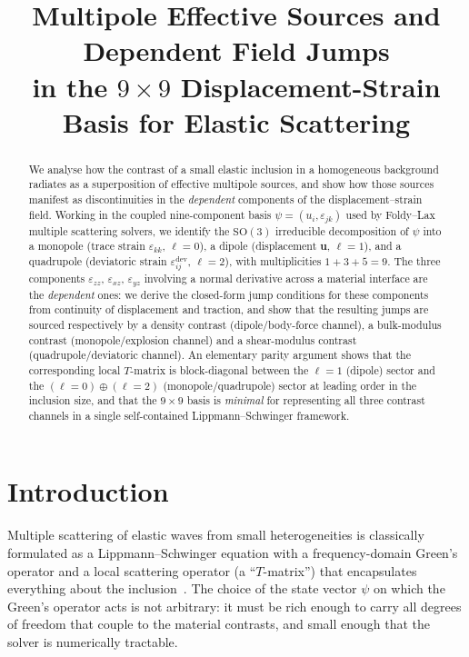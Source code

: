 \documentclass[11pt,a4paper]{article}
\title{%
  Multipole Effective Sources and Dependent Field Jumps\\
  in the $9{\times}9$ Displacement-Strain Basis for Elastic Scattering%
}
\author{}
\date{}
\newcommand{\eps}{\varepsilon}
\newcommand{\dev}{\mathrm{dev}}
\theoremstyle{plain}
\theoremstyle{definition}
\theoremstyle{remark}
\begin{document}
\maketitle
\thispagestyle{fancy}

\begin{abstract}
We analyse how the contrast of a small elastic inclusion in a homogeneous
background radiates as a superposition of effective multipole sources, and
show how those sources manifest as discontinuities in the \emph{dependent}
components of the displacement--strain field.  Working in the coupled
nine-component basis $\psi = (u_i,\eps_{jk})$ used by Foldy--Lax multiple
scattering solvers, we identify the $\mathrm{SO}(3)$ irreducible
decomposition of $\psi$ into a monopole (trace strain $\eps_{kk}$,
$\ell=0$), a dipole (displacement $\bm{u}$, $\ell=1$), and a quadrupole
(deviatoric strain $\eps_{ij}^{\dev}$, $\ell=2$), with multiplicities
$1+3+5=9$.  The three components $\eps_{zz}$, $\eps_{xz}$, $\eps_{yz}$
involving a normal derivative across a material interface are the
\emph{dependent} ones: we derive the closed-form jump conditions for these
components from continuity of displacement and traction, and show that the
resulting jumps are sourced respectively by a density contrast
(dipole/body-force channel), a bulk-modulus contrast (monopole/explosion
channel) and a shear-modulus contrast (quadrupole/deviatoric channel).
An elementary parity argument shows that the corresponding local
$T$-matrix is block-diagonal between the $\ell=1$ (dipole) sector and the
$(\ell=0)\oplus(\ell=2)$ (monopole/quadrupole) sector at leading order in
the inclusion size, and that the $9\times 9$ basis is
\emph{minimal} for representing all three contrast channels in a single
self-contained Lippmann--Schwinger framework.
\end{abstract}

\tableofcontents
\vspace{0.5em}

\section{Introduction}\label{sec:intro}
Multiple scattering of elastic waves from small heterogeneities is
classically formulated as a Lippmann--Schwinger equation with a
frequency-domain Green's operator and a local scattering operator
(a ``$T$-matrix'') that encapsulates everything about the
inclusion~\cite{foldy1945,martin2006}.  The choice of the state vector
$\psi$ on which the Green's operator acts is not arbitrary: it must be
rich enough to carry all degrees of freedom that couple to the
material contrasts, and small enough that the solver is numerically
tractable.
\end{document}
